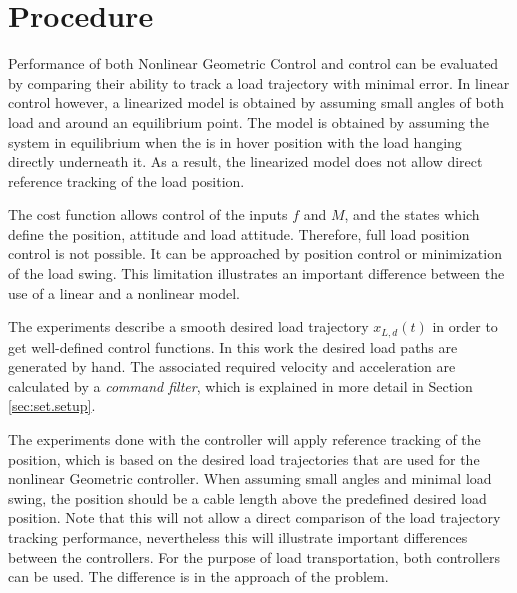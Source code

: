 \section{Procedure}\label{sec:set.proc}
Performance of both Nonlinear Geometric Control and  control can be evaluated by comparing their ability to track a load trajectory with minimal error. 
In linear control however, a linearized model is obtained by assuming small angles of both load and  around an equilibrium point. 
The model is obtained by assuming the system in equilibrium when the  is in hover position with the load hanging directly underneath it.
As a result, the linearized model does not allow direct reference tracking of the load position. 

The  cost function allows control of the inputs $ f $ and $ M $, and the states which define the  position,  attitude and load attitude. 
Therefore, full load position control is not possible. It can be approached by  position control or minimization of the load swing. This limitation illustrates an important difference between the use of a linear and a nonlinear model. 

The experiments describe a smooth desired load trajectory $ x_{L,d}(t) $ in order to get well-defined control functions.
In this work the desired load paths are generated by hand. The associated required velocity and acceleration are calculated by a \textit{command filter}, which is explained in more detail in Section \ref{sec:set.setup}.

The experiments done with the  controller will apply reference tracking of the  position, which is based on the desired load trajectories that are used for the nonlinear Geometric controller. When assuming small angles and minimal load swing, the  position should be a cable length above the predefined desired load position. 
Note that this will not allow a direct comparison of the load trajectory tracking performance, nevertheless this will illustrate important differences between the controllers. 
For the purpose of load transportation, both controllers can be used. The difference is in the approach of the problem.



